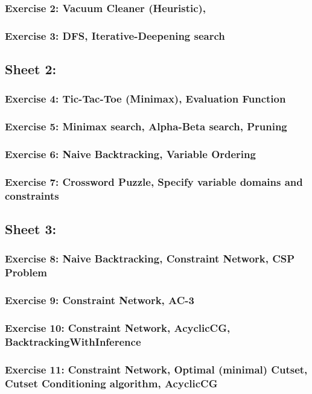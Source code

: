 \documentclass{article}
\begin{document}
        \subsubsection{Exercise 2: Vacuum Cleaner (Heuristic), }
        \subsubsection{Exercise 3: DFS, Iterative-Deepening search}
    \subsection{Sheet 2:}
        \subsubsection{Exercise 4: Tic-Tac-Toe (Minimax), Evaluation Function}
        \subsubsection{Exercise 5: Minimax search, Alpha-Beta search, Pruning}
        \subsubsection{Exercise 6: Naive Backtracking, Variable Ordering}
        \subsubsection{Exercise 7: Crossword Puzzle, Specify variable domains and constraints}
    \subsection{Sheet 3:}
        \subsubsection{Exercise 8: Naive Backtracking, Constraint Network, CSP Problem}
        \subsubsection{Exercise 9: Constraint Network, AC-3}
        \subsubsection{Exercise 10: Constraint Network, AcyclicCG, BacktrackingWithInference}
        \subsubsection{Exercise 11: Constraint Network, Optimal (minimal) Cutset, Cutset Conditioning algorithm, AcyclicCG}
\end{document}
